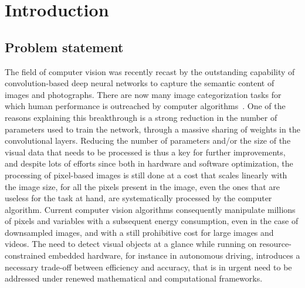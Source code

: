\section{Introduction}
\label{sec:intro}
\subsection{Problem statement}
The field of computer vision was recently recast by the outstanding capability of convolution-based deep neural networks to capture the semantic content of images and photographs. There are now many image categorization tasks for which human performance is outreached by computer algorithms~\cite{He15}. One of the reasons explaining this breakthrough is a strong reduction in the number of parameters used to train the network, through a massive sharing of weights in the convolutional layers.
Reducing the number of parameters and/or the size of the visual data that needs to be processed is thus a key for further improvements, and despite lots of efforts since both in  hardware and software optimization, the processing of pixel-based images is still done at a cost that scales linearly with the image size, for all the pixels present in the image, even the ones that are useless for the task at hand, are systematically processed by the computer algorithm. %
Current computer vision algorithms consequently manipulate millions of pixels and variables with a subsequent energy consumption, even in the case of downsampled images, and with a still prohibitive cost for large images and videos. The need to detect visual objects at a glance while running on resource-constrained embedded hardware, for instance in autonomous driving, introduces a necessary trade-off between efficiency and accuracy, that is in urgent need to be addressed under renewed mathematical and computational frameworks.

